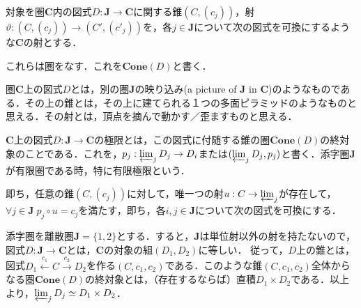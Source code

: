 \documentclass[uplatex, 12pt, dvipdfmx]{jsarticle}
\begin{document}
\vspace{3cm}

\begin{proposition*}[錐全体の圏]
    対象を圏$\mathbf{C}$内の図式$D:\mathbf{J}\to\mathbf{C}$に関する錐$(C,(c_j))$，射$\vartheta:(C,(c_j))\to (C',(c'_j))$を，各$j\in\mathbf{J}$について次の図式を可換にするような$\mathbf{C}$の射とする．
    \begin{center}
    \end{center}
    これらは圏をなす．これを$\mathbf{Cone}(D)$と書く．
\end{proposition*}
\begin{remark*}[錐のイメージ]
    圏$\mathbf{C}$上の図式$D$とは，別の圏$\mathbf{J}$の映り込み(a picture of $\mathbf{J}$ in $\mathbf{C}$)のようなものである．その上の錐とは，その上に建てられる１つの多面ピラミッドのようなものと思える．その射とは，頂点を摘んで動かす／歪ますものと思える．
\end{remark*}

\vspace{3cm}

\begin{definition}[limit]
    $\mathbf{C}$上の図式$D:\mathbf{J}\to\mathbf{C}$の極限とは，この図式に付随する錐の圏$\mathbf{Cone}(D)$の終対象のことである．これを，$p_j:\varprojlim_jD_j\to D_i$または$(\varprojlim_jD_j,p_j)$と書く．添字圏$\mathbf{J}$が有限圏である時，特に有限極限という．

    即ち，任意の錐$(C,(c_j))$に対して，唯一つの射$u:C\to\varprojlim_j$が存在して，$\forall j\in\mathbf{J}\; p_j\circ u=c_j$を満たす，即ち，各$i,j\in\mathbf{J}$について次の図式を可換にする．
    \begin{center}
    \end{center}
\end{definition}

\vspace{3cm}

\begin{example}[直積]\label{example-product}
    添字圏を離散圏$\mathbf{J}=\{1,2\}$とする．すると，$\mathbf{J}$は単位射以外の射を持たないので，図式$D:\mathbf{J}\to\mathbf{C}$とは，$\mathbf{C}$の対象の組$(D_1,D_2)$に等しい．
    従って，$D$上の錐とは，図式$D_1\xleftarrow{c_1}C\xrightarrow{c_2}D_2$を作る$(C,c_1,c_2)$である．このような錐$(C,c_1,c_2)$全体からなる圏$\mathbf{Cone}(D)$の終対象とは，（存在するならば）直積$D_1\times D_2$である．以上より，$\varprojlim_jD_j\simeq D_1\times D_2$．
\end{example}
\vspace{3cm}
\end{document}

